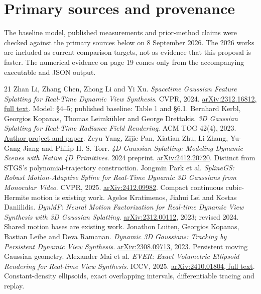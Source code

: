 \documentclass[11pt,letterpaper]{article}
\begin{document}
\section*{Primary sources and provenance}
{\small The baseline model, published measurements and prior-method claims were checked against the primary sources below on 8 September 2026. The 2026 works are included as current comparison targets, not as evidence that this proposal is faster. The numerical evidence on page 19 comes only from the accompanying executable and JSON output.}
\begingroup\small
\begin{thebibliography}{21}
\setlength{\itemsep}{5pt}
 Zhan Li, Zhang Chen, Zhong Li and Yi Xu. \textit{Spacetime Gaussian Feature Splatting for Real-Time Dynamic View Synthesis}. CVPR, 2024. \href{https://arxiv.org/html/2312.16812}{arXiv:2312.16812, full text}. Model: \S4--5; published baseline: Table 1 and \S6.1.
 Bernhard Kerbl, Georgios Kopanas, Thomas Leimk\"uhler and George Drettakis. \textit{3D Gaussian Splatting for Real-Time Radiance Field Rendering}. ACM TOG 42(4), 2023. \href{https://repo-sam.inria.fr/fungraph/3d-gaussian-splatting/}{Author project and paper}.
 Zeyu Yang, Zijie Pan, Xiatian Zhu, Li Zhang, Yu-Gang Jiang and Philip H. S. Torr. \textit{4D Gaussian Splatting: Modeling Dynamic Scenes with Native 4D Primitives}. 2024 preprint. \href{https://arxiv.org/abs/2412.20720}{arXiv:2412.20720}. Distinct from STGS's polynomial-trajectory construction.
 Jongmin Park et al. \textit{SplineGS: Robust Motion-Adaptive Spline for Real-Time Dynamic 3D Gaussians from Monocular Video}. CVPR, 2025. \href{https://arxiv.org/abs/2412.09982}{arXiv:2412.09982}. Compact continuous cubic-Hermite motion is existing work.
 Agelos Kratimenos, Jiahui Lei and Kostas Daniilidis. \textit{DynMF: Neural Motion Factorization for Real-time Dynamic View Synthesis with 3D Gaussian Splatting}. \href{https://arxiv.org/abs/2312.00112}{arXiv:2312.00112}, 2023; revised 2024. Shared motion bases are existing work.
 Jonathon Luiten, Georgios Kopanas, Bastian Leibe and Deva Ramanan. \textit{Dynamic 3D Gaussians: Tracking by Persistent Dynamic View Synthesis}. \href{https://arxiv.org/abs/2308.09713}{arXiv:2308.09713}, 2023. Persistent moving Gaussian geometry.
 Alexander Mai et al. \textit{EVER: Exact Volumetric Ellipsoid Rendering for Real-time View Synthesis}. ICCV, 2025. \href{https://arxiv.org/html/2410.01804}{arXiv:2410.01804, full text}. Constant-density ellipsoids, exact overlapping intervals, differentiable tracing and replay.

\end{thebibliography}
\end{document}
